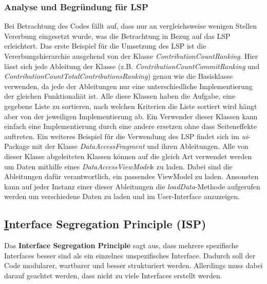 \subsubsection{Analyse und Begründung für LSP}
Bei Betrachtung des Codes fällt auf, dass nur an vergleichsweise wenigen Stellen Vererbung eingesetzt wurde, was die Betrachtung in Bezug auf das LSP erleichtert.
Das erste Beispiel für die Umsetzung des LSP ist die Vererbungshierarchie ausgehend von der Klasse \textit{ContributionCountRanking}.
Hier lässt sich jede Ableitung der Klasse (z.B. \textit{ContributionCountCommitRanking} und \textit{ContributionCountTotalContributionsRanking}) genau wie die Basisklasse verwenden, da jede der Ableitungen nur eine unterschiedliche Implementierung der gleichen Funktionaliät ist.
Alle diese Klassen haben die Aufgabe, eine gegebene Liste zu sortieren, nach welchen Kriterien die Liste sortiert wird hängt aber von der jeweiligen Implementierung ab.
Ein Verwender dieser Klassen kann einfach eine Implementierung durch eine andere ersetzen ohne dass Seiteneffekte auftreten.
\newline
Ein weiteres Beispiel für die Verwendung des LSP findet sich im \textit{ui}-Package mit der Klasse \textit{DataAccessFragment} und ihren Ableitungen.
Alle von dieser Klasse abgeleiteten Klassen können auf die gleich Art verwendet werden um Daten mithilfe eines \textit{DataAccessViewModel}s zu laden.
Dabei sind die Ableitungen dafür verantwortlich, ein passendes ViewModel zu laden.
Ansonsten kann auf jeder Instanz einer dieser Ableitungen die \textit{loadData}-Methode aufgerufen werden um verschiedene Daten zu laden und im User-Interface anzuzeigen.


\newpage
\subsection{\underline{I}nterface Segregation Principle (ISP)}

Das \textbf{Interface Segregation Principle} sagt aus, dass mehrere spezifische Interfaces besser sind als ein einzelnes unspezifisches Interface.
Dadurch soll der Code modularer, wartbarer und besser strukturiert werden. 
Allerdings muss dabei darauf geachtet werden, dass nicht zu viele Interfaces erstellt werden.

